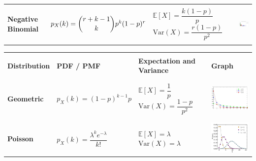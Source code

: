 \documentclass[a4paper,10pt,landscape]{article}
\newcommand{\var}{\textrm{Var}}
\begin{document}
\begin{table}[h!]
\begin{tabular}{| C{4.5cm} | C{7cm} | C{6cm} | C{7cm} |}
		&&&\\ \hline
		&&&\\ 
		{\bf Negative Binomial} & $p_X(k)=\dbinom{r+k-1}{k}p^k(1-p)^r$ & $\mathbb{E}[X]=\dfrac{k(1-p)}{p}$ \newline\vspace*{3pt}$\var(X)=\dfrac{r(1-p)}{p^2}$ & \includegraphics[width=3.75cm]{negbinomial.png}\\
		&&&\\ \hline
	\end{tabular}
\end{table}
\newpage
\begin{table}[h!]
	\begin{tabular}{| C{4.5cm} | C{7cm} | C{6cm} | C{7cm} |}
		\hline
		&&&\\
		{\bf Distribution} &
		{\bf PDF / PMF} & {\bf Expectation and Variance} & {\bf Graph} \\ 
		&&&\\ \hline
		&&&\\
		{\bf Geometric} & $p_X(k)=(1-p)^{k-1}p$ & $\mathbb{E}[X]=\dfrac{1}{p}$ \newline\vspace*{3pt}$\var(X)=\dfrac{1-p}{p^2}$ & \includegraphics[width=3.75cm]{geometric.png}\\
		&&&\\ \hline
		&&&\\
		{\bf Poisson} & $p_X(k)=\dfrac{\lambda^ke^{-\lambda}}{k!}$ & $\mathbb{E}[X]=\lambda$ \newline\vspace*{3pt}$\var(X)=\lambda$ & \includegraphics[width=3.75cm]{poisson.png}\\

\end{tabular}
\end{table}
\end{document}
